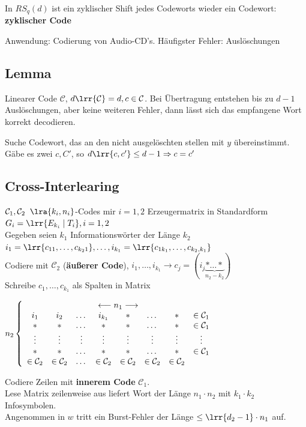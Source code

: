 			In $RS_q(d)$ ist ein zyklischer Shift jedes Codeworts wieder ein Codewort: \textbf{zyklischer Code}
			
			Anwendung: Codierung von Audio-CD's. Häufigster Fehler: Auslöschungen
	\subExEnd
	
\subsection{Lemma}
	Linearer Code $\mathcal{C}$, $d\lrr{\mathcal{C}}=d, c\in\mathcal{C}$. Bei Übertragung entstehen bis zu $d-1$ Auslöschungen, aber keine weiteren Fehler, dann lässt sich das empfangene Wort korrekt decodieren.
	
	Suche Codewort, das an den nicht ausgelöschten stellen mit $y$ übereinstimmt.\\
	Gäbe es zwei $c,C'$, so $d\lrr{c,c'}\leq d-1\Rightarrow c=c'$
	
\subsection{Cross-Interlearing}
	$\mathcal{C}_1, \mathcal{C}_2\;\; \lra{k_i,n_i}$-Codes mir $i=1,2$ Erzeugermatrix in Standardform $G_i=\lrr{E_{k_i}\mid T_i}, i=1,2$\\
	Gegeben seien $k_1$ Informationswörter der Länge $k_2$\\
	$i_1=\lrr{c_{11},\dots,c_{k_21}},\dots,i_{k_1}=\lrr{c_{1k_1},\dots,c_{k_2,k_1}}$\\
	Codiere mit $\mathcal{C}_2$ (\textbf{äußerer Code}), $i_1,\dots,i_{k_1}\rightarrow c_j=(i_j\underbrace{*\dots*}_{n_2-k_2})$\\
	Schreibe $c_1,\dots,c_{k_1}$ als Spalten in Matrix
	
	$n_2\left\lbrace\begin{array}{cccccccc}
		\multicolumn{8}{c}{\longleftarrow n_1 \longrightarrow}\\
		i_1&i_2&\dots&i_{k_1}&*&\dots&*&\in\mathcal{C}_1\\
		*&*&\dots&*&*&\dots&*&\in\mathcal{C}_1\\
		\vdots&\vdots&\vdots&\vdots&\vdots&\vdots&\vdots&\vdots\\
		*&*&\dots&*&*&\dots&*&\in\mathcal{C}_1\\
		\in\mathcal{C}_2&\in\mathcal{C}_2&\dots&\in\mathcal{C}_2&\in\mathcal{C}_2&\in\mathcal{C}_2&\in\mathcal{C}_2&
	\end{array}\right.$
	
	Codiere Zeilen mit \textbf{innerem Code} $\mathcal{C}_1$.\\
	Lese Matrix zeilenweise aus liefert Wort der Länge $n_1\cdot n_2$ mit $k_1\cdot k_2$ Infosymbolen.\\
	Angenommen in $w$ tritt ein Burst-Fehler der Länge $\leq\lrr{d_2-1}\cdot n_1$ auf.
	
